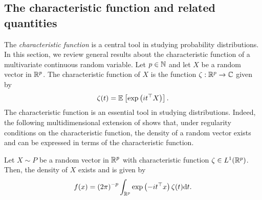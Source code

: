 \subsection{The characteristic function and related quantities} \label{sec-charfun}

The \textit{characteristic function} is a central tool in studying probability distributions. In this section, we review general results about the characteristic function of a multivariate continuous random variable. Let $p \in \N$ and let $X$ be a random vector in $\Rp$. The characteristic function of $X$ is the function $\zeta : \Rp \rightarrow \C$ given by
\begin{equation*}
    \zeta(t) = \expec{}{\expf{it^\top X}}.
\end{equation*}
The characteristic function is an essential tool in studying distributions. Indeed, the following multidimensional extension of \cite[Theorem 2.4.2]{kolassa2006series} shows that, under regularity conditions on the characteristic function, the density of a random vector exists and can be expressed in terms of the characteristic function.

\begin{theorem} \label{thm-char-inversion}
    Let $X \sim P$ be a random vector in $\Rp$ with characteristic function $\zeta \in L^1(\Rp)$. Then, the density of $X$ exists and is given by
    \begin{equation} \label{eq-density-via-charfun}
        f(x) = \left(2\pi\right)^{-p} \intRp{t}{ \expf{-it^\top x}\zeta(t) }.
    \end{equation}
\end{theorem}

